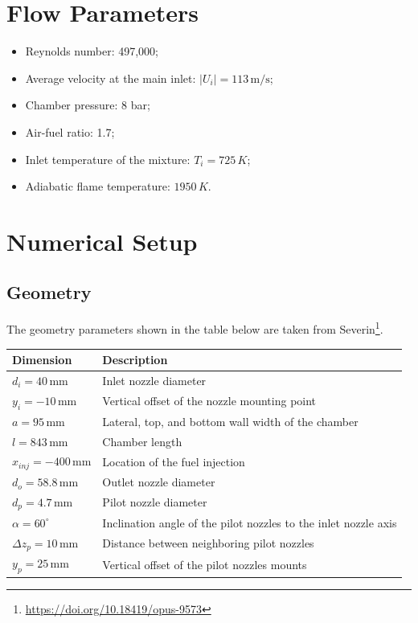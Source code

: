 \section*{Flow Parameters}
\begin{itemize}
    \item Reynolds number: 497,000;
    \item Average velocity at the main inlet: $\left| U_i \right| = 113 \, \text{m/s}$;
    \item Chamber pressure: 8 bar;
    \item Air-fuel ratio: 1.7;
    \item Inlet temperature of the mixture: $T_i = 725 \, K$;
    \item Adiabatic flame temperature: $1950 \, K$.
\end{itemize}

\section*{Numerical Setup}

\subsection*{Geometry}
The geometry parameters shown in the table below are taken from Severin\footnote{\url{https://doi.org/10.18419/opus-9573}}.

\begin{table}[H]
    \centering
    \begin{tabular}{ll}
        \hline
        Dimension & Description \\ \hline
        $d_i = 40 \, \text{mm}$ & Inlet nozzle diameter \\
        $y_i = -10 \, \text{mm}$ & Vertical offset of the nozzle mounting point \\
        $a = 95 \, \text{mm}$ & Lateral, top, and bottom wall width of the chamber \\
        $l = 843 \, \text{mm}$ & Chamber length \\
        $x_{inj} = -400 \, \text{mm}$ & Location of the fuel injection \\
        $d_o = 58.8 \, \text{mm}$ & Outlet nozzle diameter \\
        $d_p = 4.7 \, \text{mm}$ & Pilot nozzle diameter \\
        $\alpha = 60^\circ$ & Inclination angle of the pilot nozzles to the inlet nozzle axis \\
        $\Delta z_p = 10 \, \text{mm}$ & Distance between neighboring pilot nozzles \\
        $y_p = 25 \, \text{mm}$ & Vertical offset of the pilot nozzles mounts \\ \hline
    \end{tabular}
\end{table}

